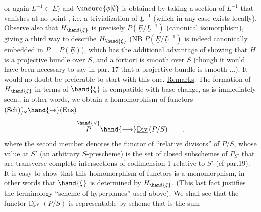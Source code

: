 
or again $\underline{L}^{-1}\subset\underline{E}$) and $\unsure{\phi|\emptyset}$ is obtained by taking  a section of $\underline{L}^{-1}$ that
vanishes at no point , i.e. a trivialization of $\underline{L}^{-1}$
(which in any case exists locally). Observe also that $H_{\hand{\xi}}$ is
precisely $P(\underline{E}/\underline{L}^{-1})$ (canonical isomorphism), giving a third
way to describe $H_{\hand{\xi}}$ (NB $P(\underline{E}/\underline{L}^{-1})$ is indeed canonically embedded in
$P = P(\underline{E})$), which has the additional advantage of showing that $H$ is a projective
bundle over $S$, and a fortiori is smooth over $S$ (though it would have been necessary to say 
 in par. 17 that a projective bundle is smooth ...). It would no doubt
 be preferable to start with this one.
\uline{Remarks}. The formation of $H_{\hand{\xi}}$ in terms of $\hand{\xi}$ is compatible with
base change, as is immediately seen., in other words,
we obtain a homomorphism of functors $(\mathrm{Sch})^{\circ}_{/S}\hand{\to}(\mathrm{Ens})$
\[ \overset{\hand{\vee}}{P} \hand{\longrightarrow} \underline{\mathrm{Div}}\,(P/S) \qquad , \]
where the second member denotes the functor of ``relative divisors'' of $P/S$,
whose value at $S'$ (an arbitrary $S$-prescheme) is the set of
closed subschemes of $P_{S'}$ that are transverse complete intersections
of codimension 1 relative to $S'$ (cf par.19). It is easy to show
that this homomorphism of functors is a monomorphism, in other
words that $\hand{\xi}$ is determined by $H_{\hand{\xi}}$. (This last fact justifies the terminology
``scheme of hyperplanes'' used above). We shall see  
 that the functor $\underline{\mathrm{Div}}$ $(P/S)$ is representable by scheme that is the sum
